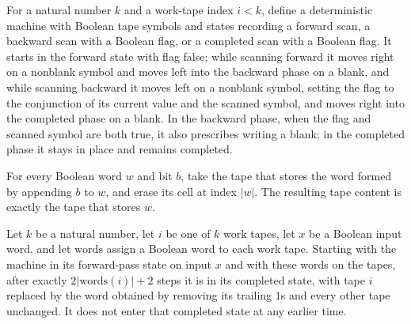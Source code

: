 \begin{definition}
\label{Turing.MachineFormat.canonTrimTM}
\leanok
{}
For a natural number $k$ and a work-tape index $i<k$, define a deterministic machine
with Boolean tape symbols and states recording a forward scan, a backward scan with a
Boolean flag, or a completed scan with a Boolean flag. It starts in the forward state
with flag false; while scanning forward it moves right on a nonblank symbol and moves
left into the backward phase on a blank, and while scanning backward it moves left on a
nonblank symbol, setting the flag to the conjunction of its current value and the
scanned symbol, and moves right into the completed phase on a blank. In the backward
phase, when the flag and scanned symbol are both true, it also prescribes writing a
blank; in the completed phase it stays in place and remains completed.
\end{definition}

\begin{lemma}
\label{Turing.MachineFormat.canonEraseLast}
\leanok
{}
For every Boolean word $w$ and bit $b$, take the tape that stores the word formed by
appending $b$ to $w$, and erase its cell at index $|w|$. The resulting tape content is
exactly the tape that stores $w$.
\end{lemma}

\begin{lemma}
\label{Turing.MachineFormat.canonTrim_run}
\leanok
{}
Let $k$ be a natural number, let $i$ be one of $k$ work tapes, let $x$ be a Boolean
input word, and let $\mathrm{words}$ assign a Boolean word to each work tape. Starting
with the machine in its forward-pass state on input $x$ and with these words on the
tapes, after exactly $2|\mathrm{words}(i)|+2$ steps it is in its completed state, with
tape $i$ replaced by the word obtained by removing its trailing $1$s and every other
tape unchanged. It does not enter that completed state at any earlier time.
\end{lemma}


